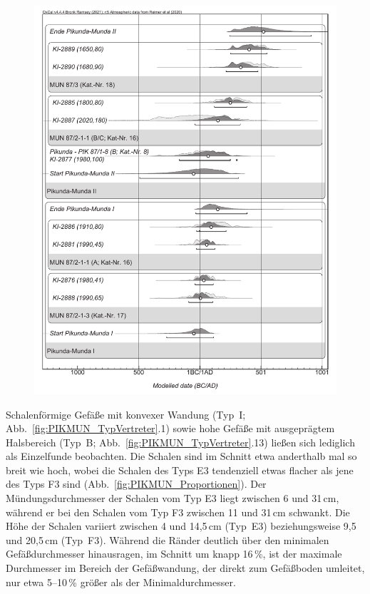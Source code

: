 \begin{figure}[tb]
\begin{minipage}[b]{\columnwidth}
	\includegraphics[width=\columnwidth]{fig/PKM_14C.pdf}
	\end{minipage}
\end{figure}

Schalenförmige Gefäße mit konvexer Wandung (Typ~I; Abb.~\ref{fig:PIKMUN_TypVertreter}.1) sowie hohe Gefäße mit ausgeprägtem Halsbereich (Typ~B; Abb.~\ref{fig:PIKMUN_TypVertreter}.13) ließen sich lediglich als Einzelfunde beobachten. Die Schalen sind im Schnitt etwa anderthalb mal so breit wie hoch, wobei die Schalen des Typs E3 tendenziell etwas flacher als jene des Typs F3 sind (Abb.~\ref{fig:PIKMUN_Proportionen}). Der Mündungsdurchmesser der Schalen vom Typ E3 liegt zwischen 6 und 31\,cm, während er bei den Schalen vom Typ F3 zwischen 11 und 31\,cm schwankt. Die Höhe der Schalen variiert zwischen 4 und 14,5\,cm (Typ~E3) beziehungsweise 9,5 und 20,5\,cm (Typ~F3). Während die Ränder deutlich über den minimalen Gefäßdurchmesser hinausragen, im Schnitt um knapp 16\,\%, ist der maximale Durchmesser im Bereich der Gefäßwandung, der direkt zum Gefäßboden umleitet, nur etwa 5--10\,\% größer als der Minimaldurchmesser.

